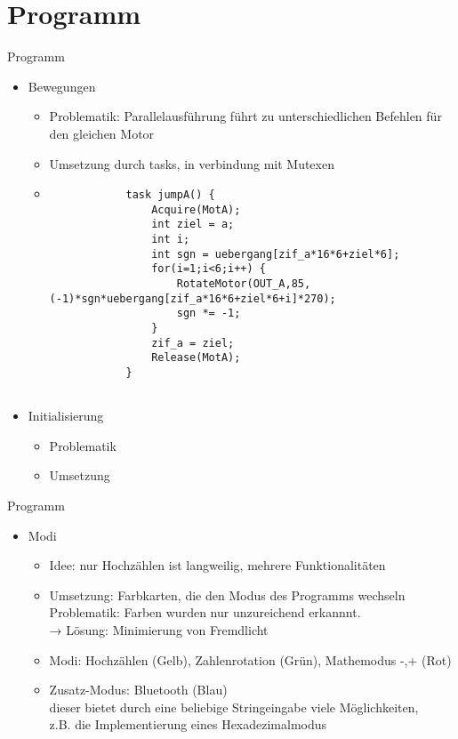 \documentclass{beamer}
\begin{document}
\section{Programm}
\begin{frame}[fragile]{Programm}
\begin{itemize}
	\item Bewegungen
	\begin{itemize}
		\item Problematik: Parallelausführung führt zu unterschiedlichen Befehlen für den gleichen Motor
		\item Umsetzung durch tasks, in verbindung mit Mutexen
		\vspace{.5em}
		\item {\tiny\begin{verbatim}
			task jumpA() {
			    Acquire(MotA);
			    int ziel = a;
			    int i;
			    int sgn = uebergang[zif_a*16*6+ziel*6];
			    for(i=1;i<6;i++) {
			        RotateMotor(OUT_A,85,(-1)*sgn*uebergang[zif_a*16*6+ziel*6+i]*270);
			        sgn *= -1;
			    }
			    zif_a = ziel;
			    Release(MotA);
			}
			
		\end{verbatim}
		}
	\end{itemize}
	\item<2> Initialisierung
	\begin{itemize}
		\item Problematik
		\item Umsetzung
	\end{itemize}
\end{itemize}
\end{frame}
\begin{frame}[fragile]{Programm}
\begin{itemize}
	\item Modi
	\begin{itemize}
		\item Idee: nur Hochzählen ist langweilig, mehrere Funktionalitäten
		\item Umsetzung: Farbkarten, die den Modus des Programms wechseln\\
		     Problematik: Farben wurden nur unzureichend erkannnt.\\
   			  → Lösung: Minimierung von Fremdlicht
		\item Modi: Hochzählen (Gelb), Zahlenrotation (Grün), Mathemodus -,+ (Rot)
		\item Zusatz-Modus: Bluetooth (Blau)\\
		     dieser bietet durch eine beliebige Stringeingabe viele Möglichkeiten,\\
			 z.B. die Implementierung eines Hexadezimalmodus
	\end{itemize}
\end{itemize}
\end{frame}
\end{document}
